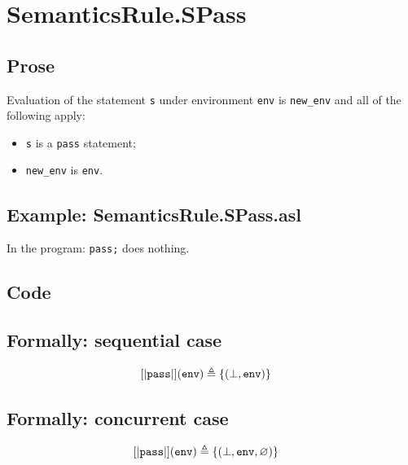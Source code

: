 \documentclass{book}
\begin{document}
\section{SemanticsRule.SPass \label{sec:SemanticsRule.SPass}}

  \subsection{Prose}
  Evaluation of the statement \texttt{s} under environment \texttt{env} is
\texttt{new\_env} and all of the following apply:
  \begin{itemize}
  \item \texttt{s} is a \texttt{pass} statement;
  \item \texttt{new\_env} is \texttt{env}.
  \end{itemize}

  \subsection{Example: SemanticsRule.SPass.asl}
  In the program:
  \texttt{pass;} does nothing.

  \subsection{Code}

\begin{formal}
  \subsection{Formally: sequential case}
  \begin{align}
  \left[| \mathtt{pass} \right|] (\texttt{env}) & \triangleq \{ (\bot, \texttt{env}) \}
  \label{eq:sem-seq-spass}
\end{align}

  \subsection{Formally: concurrent case}
  \begin{align}
  \left[| \mathtt{pass} \right|] (\texttt{env}) & \triangleq \{ (\bot, \texttt{env}, \varnothing) \}
  \label{eq:sem-conc-spass}
  \end{align}
\end{formal}
\end{document}
